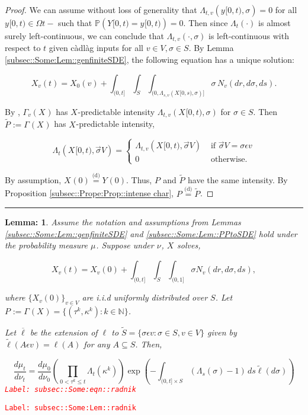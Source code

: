 \documentclass[12pt]{article}
\newcommand{\mb}{\mathbb}
\newcommand{\ov}{\overline}
\newcommand{\te}{\text}
\newcommand{\ep}{\epsilon}
\newcommand{\tr}{\textcolor{red}}
\newcommand{\labe}[1]{\tr{\texttt{Label: #1}}}
\newcommand{\ind}{\hspace{24pt}}
\newcommand{\lin}{\rule{\linewidth}{0.4 pt}}
\newcommand{\pr}{\mb{P}}							%
\newcommand{\deq}{\overset{\text{(d)}}{=}}			%
\newcommand{\defeq}{:=}								%
\renewcommand{\v}{v}							%
\renewcommand{\S}{S}							%
\newcommand{\s}{\sigma}							%
\newcommand{\sv}{\vec{\s}}						%
\newcommand{\ev}{\ep}							%
\renewcommand{\t}{t}							%
\newcommand{\poiss}[1]{N_{#1}}						%
\newcommand{\V}{V}									%
\renewcommand{\tt}{s}								%
\renewcommand{\r}{r}								%
\newcommand{\rt}[1]{\tau^{#1}}						%
\renewcommand{\it}{k}								%
\newcommand{\XState}[1]{\S^{#1}}				%
\newcommand{\rxvt}[2]{X_{#1}{(#2)}}					%
\newcommand{\rxvtt}[2]{Y_{#1}{(#2)}}				%
\newcommand{\xvtts}[2]{y_{#1}{#2}}					%
\newcommand{\rxvts}[2]{X_{#1}{#2}}					%
\newcommand{\rxvtts}[2]{Y_{#1}{#2}}					%
\newcommand{\rp}[1]{P^{#1}}							%
\newcommand{\m}[3]{\mu_{#2#1}^{#3}}						%
\newcommand{\mm}[3]{\nu_{#2#1}^{#3}}						%
\newcommand{\ratee}[1]{\Lambda_{#1}}				%
\newcommand{\Sm}{\ell}								%
\newcommand{\alt}{\widetilde}						%
\newcommand{\typset}{A}							%
\renewcommand{\mark}[1]{\kappa^{#1}}				%
\newcommand{\pmap}[1]{\Gamma_{#1}}				%
\newtheorem{lem}[thms]{Lemma: }
\begin{document}
\begin{proof}

We can assume without loss of generality that \(\ratee{\t,\v}(\xvtts{}{[0,\t)},\s) = 0\) for all \(\xvtts{}{[0,\t)}\in \Omega{}{\t-}\) such that \(\pr(\rxvtts{}{[0,\t)} = \xvtts{}{[0,\t)}) = 0\). Then since \(\ratee{\t}(\cdot)\) is almost surely left-continuous, we can conclude that \(\ratee{\t,\v}(\cdot,\s)\) is left-continuous with respect to \(\t\) given c\`adl\`ag inputs for all \(\v\in \V,\s\in\S\). By Lemma \ref{subsec::Some:Lem::genfiniteSDE}, the following equation has a unique solution:

\[\rxvt{\v}{\t} = \rxvt{0}{\v} + \int_{(0,\t]}\int_\S\int_{(0,\ratee{\tt,\v}(\rxvts{}{[0,\tt)},\s)]}  \s\,\poiss{\v}(d\r,d\s,d\tt).\]

By \cite[Exercise 14.7.1]{DalVer08}, \(\pmap{\v}(\rxvts{}{})\) has \(\rxvts{}{}\)-predictable intensity \(\ratee{\t,\v}(\rxvts{}{[0,\t)},\s)\) for \(\s \in \S\). Then \(\alt{\rp{}} \defeq \pmap{}(\rxvts{}{})\) has \(\rxvts{}{}\)-predictable intensity,

\[\ratee{\t}(\rxvts{}{[0,\t)},\sv{}{\V}) = \begin{cases}
\ratee{\t,\v}(\rxvts{}{[0,\t)},\sv{}{\V}) &\te{ if } \sv{}{\V} = \s\ev{\v}\\
0&\te{ otherwise.}
\end{cases}\]

By assumption, \(\rxvt{}{0} \deq \rxvtt{}{0}\). Thus, \(\rp{}\) and \(\alt{\rp{}}\) have the same intensity. By Proposition \ref{subsec::Prope:Prop::intense char}, \(\rp{} \deq \alt{\rp{}}\).
\end{proof}
\lin

\begin{lem}
Assume the notation and assumptions from Lemmas \ref{subsec::Some:Lem::genfiniteSDE} and \ref{subsec::Some:Lem::PPtoSDE} hold under the probability measure \(\m{}{}{}\). Suppose under \(\mm{}{}{}\), \(\rxvts{}{}\) solves,

\[\rxvt{\v}{\t} = \rxvt{\v}{0} +\int_{(0,\t]}\int_\S\int_{(0,1]} \s \poiss{\v}(d\r,d\s,d\tt),\]

where \(\{\rxvt{\v}{0}\}_{\v \in \V}\) are i.i.d uniformly distributed over \(\S\). Let \(\rp{} \defeq \pmap{}(\rxvts{}{}) = \{(\rt{\it},\mark{\it}):\it\in \mb{N}\}\).

\ind Let \(\ov{\ell}\) be the extension of \(\Sm\) to \(\alt{\S} = \{\s\ev{\v}: \s \in \S, \v \in \V\}\) given by \(\alt{\Sm}(\typset\ev{\v}) = \Sm(\typset)\) for any \(\typset \subseteq \S\). Then,

\begin{equation}
\frac{d\m{}{\t}{}}{d\mm{}{\t}{}}= \frac{d\m{}{0}{}}{d\mm{}{0}{}}\left(\prod_{0< \rt{\it}\leq t} \ratee{\t}(\mark{\it})\right)\exp\left(-\int_{(0,\t]\times \S} (\ratee{\tt}(\s) - 1)\,d\tt\alt{\Sm}(d\s)\right)
\label{subsec::Some:eqn::radnik}
\end{equation}
\labe{subsec::Some:eqn::radnik}
\label{subsec::Some:Lem::radnik}
\end{lem}
\labe{subsec::Some:Lem::radnik}
\end{document}
